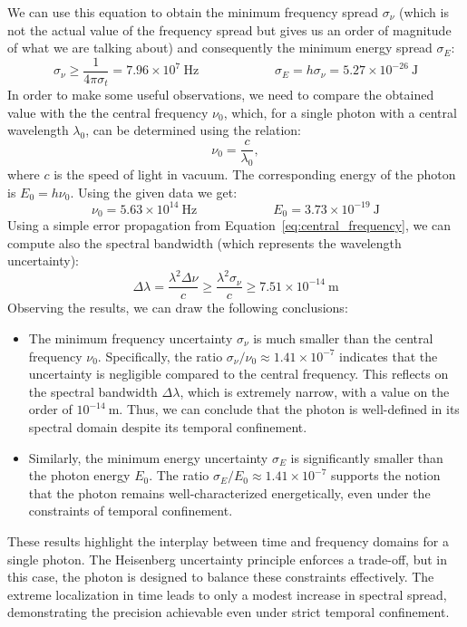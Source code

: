 \documentclass[prl, 11 pt]{revtex4-2}
\begin{document}
%
We can use this equation to obtain the minimum frequency spread $\sigma_\nu$ (which is not the actual value of the frequency spread but gives us an order of magnitude of what we are talking about) and consequently the minimum energy spread $\sigma_E$:
$$
    \sigma_\nu \geq \frac{1}{4\pi \sigma_t} = 7.96 \times 10^7~\si{\hertz} \qquad \qquad \qquad \sigma_E = h\sigma_\nu = 5.27 \times 10^{-26}~\si{\joule}
$$ 
In order to make some useful observations, we need to compare the obtained value with the the central frequency $\nu_0$, which, for a single photon with a central wavelength $\lambda_0$, can be determined using the relation:
\begin{equation}
    \label{eq:central_frequency}
    \nu_0 = \frac{c}{\lambda_0},
\end{equation}
where $c$ is the speed of light in vacuum. The corresponding energy of the photon is $E_0 = h\nu_0$. Using the given data we get:
$$
\nu_0 = 5.63 \times 10^{14}~\si{\hertz} \qquad \qquad \qquad E_0 = 3.73 \times 10^{-19}~\si{\joule}
$$
Using a simple error propagation from Equation~\eqref{eq:central_frequency}, we can compute also the spectral bandwidth (which represents the wavelength uncertainty):
%
$$
    \Delta \lambda = \frac{\lambda^2\Delta\nu}{c} \geq \frac{\lambda^2\sigma_\nu}{c} \geq 7.51 \times 10^{-14}~\si{\meter}
$$
\newpage
Observing the results, we can draw the following conclusions:
\begin{itemize}
    \item The minimum frequency uncertainty $\sigma_\nu$ is much smaller than the central frequency $\nu_0$. Specifically, the ratio $\sigma_\nu / \nu_0 \approx 1.41 \times 10^{-7}$ indicates that the uncertainty is negligible compared to the central frequency. This reflects on the spectral bandwidth $\Delta \lambda$, which is extremely narrow, with a value on the order of $10^{-14}~\si{\meter}$. Thus, we can conclude that the photon is well-defined in its spectral domain despite its temporal confinement.
    
    \item Similarly, the minimum energy uncertainty $\sigma_E$ is significantly smaller than the photon energy $E_0$. The ratio $\sigma_E / E_0 \approx 1.41 \times 10^{-7}$ supports the notion that the photon remains well-characterized energetically, even under the constraints of temporal confinement.
\end{itemize}

These results highlight the interplay between time and frequency domains for a single photon. The Heisenberg uncertainty principle enforces a trade-off, but in this case, the photon is designed to balance these constraints effectively. The extreme localization in time leads to only a modest increase in spectral spread, demonstrating the precision achievable even under strict temporal confinement.

\end{document}
